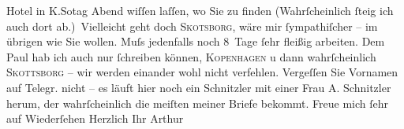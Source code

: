 \begin{ledgroupsized}[t]{13cm}
               Hotel in K.So{\geminationn}tag Abend wiſſen laſſen, wo Sie zu
               finden (Wahrſcheinlich ſteig ich {\pb}auch dort
               ab.) Vielleicht geht doch \textsc{Skotsborg}, wäre mir ſympathiſcher – im übrigen wie Sie wollen. Muſs jedenfalls noch
               8 Tage ſehr fleißig arbeiten. Dem Paul hab ich
               auch nur ſchreiben können, \textsc{Kopenhagen} u dann wahrſcheinlich \textsc{Skottsborg} – wir werden einander wohl nicht verfehlen. Vergeſſen Sie Vornamen auf Telegr.
               nicht – es läuft hier noch ein Schnitzler mit
               einer Frau A. Schnitzler herum, der
               wahrſcheinlich die meiſten meiner Briefe bekommt. Freue mich ſehr auf Wiederſehen\pend
           \pstart Herzlich Ihr \spacefill\mbox{Arthur}\pend{}
         
         \endnumbering{}\end{ledgroupsized}  \newcommand{\dateiname}{L00571}\newcommand{\titel}{Arthur Schnitzler an Richard Beer-Hofmann, 29. 7. 1896}\newcommand{\editorInnen}{Martin Anton Müller und Gerd-Hermann Susen}
      